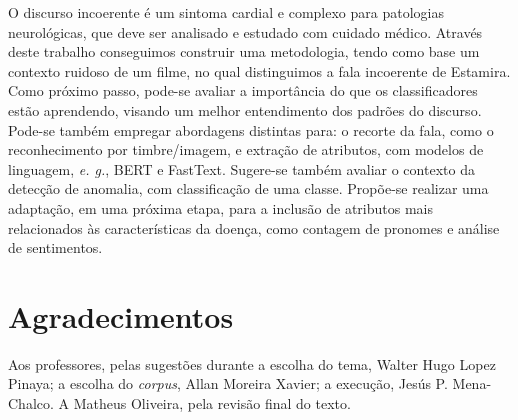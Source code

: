 \documentclass[11pt]{article}
\begin{document}
O discurso incoerente é um sintoma cardial e complexo para patologias neurológicas, que deve ser analisado e estudado com cuidado médico. Através deste trabalho conseguimos construir uma metodologia, tendo como base um contexto ruidoso de um filme, no qual distinguimos a fala incoerente de Estamira. Como próximo passo, pode-se avaliar a importância do que os classificadores estão aprendendo, visando um melhor entendimento dos padrões do discurso. Pode-se também empregar abordagens distintas para: o recorte da fala, como o reconhecimento por timbre/imagem, e extração de atributos, com modelos de linguagem, \textit{e. g.}, BERT e FastText. Sugere-se também avaliar o contexto da detecção de anomalia, com classificação de uma classe. Propõe-se realizar uma adaptação, em uma próxima etapa, para a inclusão de atributos mais relacionados às características da doença, como contagem de pronomes e análise de sentimentos. 

\section*{Agradecimentos}\label{sec:agr}

Aos professores, pelas sugestões durante a escolha do tema, Walter Hugo Lopez Pinaya; a escolha do \textit{corpus}, Allan Moreira Xavier; a execução, Jesús P. Mena-Chalco. A Matheus Oliveira, pela revisão final do texto.



{\scriptsize
}
\end{document}
